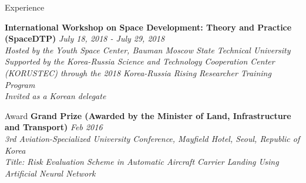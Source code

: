 \documentclass{resume}
\begin{document}
%
%
%
%
% 
%
%
%

\begin{rSection}{Experience}\normalfont

{\bf International Workshop on Space Development: Theory and Practice (SpaceDTP)} \hfill {\em July 18, 2018 - July 29, 2018} 
\\{\textit{ Hosted by the Youth Space Center, Bauman Moscow State Technical University}}
\\{\textit{ Supported by the Korea-Russia Science and Technology Cooperation Center (KORUSTEC) through the 2018 Korea-Russia Rising Researcher Training Program}}
\\{\textit{ Invited as a Korean delegate}}

\end{rSection}


%
%
%
%
%
%
\begin{rSection}{Award}\normalfont
{\bf Grand Prize (Awarded by the Minister of Land, Infrastructure and Transport)} \hfill {\em Feb 2016} \\ 
\textit{3rd Aviation-Specialized University Conference, Mayfield Hotel, Seoul, Republic of Korea} \\
\textit{Title: Risk Evaluation Scheme in Automatic Aircraft Carrier Landing Using Artificial Neural Network}

\end{rSection}
\end{document}
